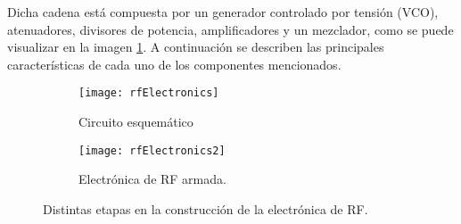 Dicha cadena está compuesta por un generador controlado por tensión (VCO), atenuadores, divisores de potencia, amplificadores y un mezclador, como se puede visualizar en la imagen \ref{fig:rfElectronics}. A continuación se describen las principales características de cada uno de los componentes mencionados.

\begin{figure}[htb]
  \centering
  \begin{subfigure}{\textwidth}
    \centering
    \texttt{[image: rfElectronics]}
    \caption{Circuito esquemático}
  \end{subfigure}

  \begin{subfigure}{\textwidth}
    \centering
    \texttt{[image: rfElectronics2]}
    \caption{Electrónica de RF armada.}
  \end{subfigure}
  \caption{Distintas etapas en la construcción de la electrónica de RF.}
  \label{fig:rfElectronics}
\end{figure}

